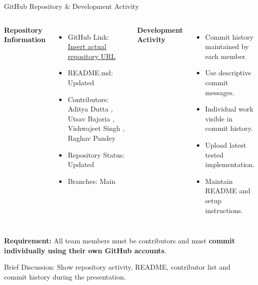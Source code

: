 \documentclass[aspectratio=169,11pt]{beamer}
\newcommand{\smallnote}[1]{%
\vspace{0.08cm}
{\scriptsize\color{GEUGrey}#1}
}
\begin{document}
\begin{frame}{GitHub Repository \& Development Activity}

\begin{columns}[T,totalwidth=\textwidth]


\textbf{\color{GEUBlue}Repository Information}

\begin{itemize}\itemsep3pt
\item GitHub Link: \href{https://github.com/}{Insert actual repository URL}
\item README.md: Updated
\item Contributors: Aditya Dutta , Utsav Bajoria , 
                    Vishwajeet Singh , Raghav Pandey
\item Repository Status: Updated
\item Branches: Main
\end{itemize}


\textbf{\color{GEUBlue}Development Activity}

\begin{itemize}\itemsep3pt
\item Commit history maintained by each member.
\item Use descriptive commit messages.
\item Individual work visible in commit history.
\item Upload latest tested implementation.
\item Maintain README and setup instructions.
\end{itemize}

\end{columns}

\vfill

\begin{center}
\colorbox{GEULightBlue}{
\parbox{.88\textwidth}{
\centering
\textbf{Requirement:}
All team members must be contributors and must
\textbf{commit individually using their own GitHub accounts}.
}}
\end{center}

\smallnote{
Brief Discussion: Show repository activity, README, contributor list
and commit history during the presentation.
}

\end{frame}
\end{document}
